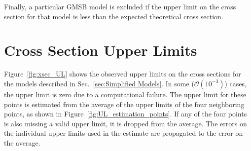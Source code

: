 \documentclass[dissertation.tex]{subfiles}
\begin{document}
Finally, a particular GMSB model is excluded if the upper limit on the cross section for that model is less than the expected theoretical cross section.

\section{Cross Section Upper Limits}
\label{sec:Cross Section Upper Limits}

Figure~\ref{fig:xsec_UL} shows the observed upper limits on the cross sections for the models described in Sec.~\ref{sec:Simplified Models}.  In some ($\mathcal{O}(10^{-3})$) cases, the upper limit is zero due to a computational failure.  The upper limit for these points is estimated from the average of the upper limits of the four neighboring points, as shown in Figure~\ref{fig:UL_estimation_points}.  If any of the four points is also missing a valid upper limit, it is dropped from the average.  The errors on the individual upper limits used in the estimate are propagated to the error on the average.
\end{document}
